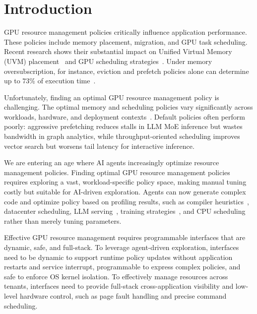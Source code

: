 \section{Introduction}

GPU resource management policies critically influence application performance. These policies include memory placement, migration, and GPU task scheduling. Recent research shows their substantial impact on Unified Virtual Memory (UVM) placement~\cite{wang2024suv,lin2025forest,kim2025dream,park2025helm} and GPU scheduling strategies~\cite{wang2024gcaps,fan2025gpreempt,shen2025xsched}. Under memory oversubscription, for instance, eviction and prefetch policies alone can determine up to 73\% of execution time~\cite{park2025helm,kehne2019etc,ganguly2019interplay}.

Unfortunately, finding an optimal GPU resource management policy is challenging. The optimal memory and scheduling policies vary significantly across workloads, hardware, and deployment contexts~\cite{kwon2023efficient,agrawal2024taming,lin2024towards,wang2016gunrock,shoeybi2019megatron,rasley2020deepspeed,pan2024survey,cao2023gpu}. Default policies often perform poorly: aggressive prefetching reduces stalls in LLM MoE inference but wastes bandwidth in graph analytics, while throughput-oriented scheduling improves vector search but worsens tail latency for interactive inference.

We are entering an age where AI agents increasingly optimize resource management policies. Finding optimal GPU resource management policies requires exploring a vast, workload-specific policy space, making manual tuning costly but suitable for AI-driven exploration. Agents can now generate complex code and optimize policy based on profiling results, such as compiler heuristics~\cite{alphaevolve2025}, datacenter scheduling, LLM serving~\cite{hamadanian2025glia,cheng2025barbarians}, training strategies~\cite{ding2025asap}, and CPU scheduling~\cite{dwivedula2025policysmith,zheng2025schedcp} rather than merely tuning parameters.

Effective GPU resource management requires programmable interfaces that are dynamic, safe, and full-stack. To leverage agent-driven exploration, interfaces need to be dynamic to support runtime policy updates without application restarts and service interrupt, programmable to express complex policies, and safe to enforce OS kernel isolation. To effectively manage resources across tenants, interfaces need to provide full-stack cross-application visibility and low-level hardware control, such as page fault handling and precise command scheduling.

